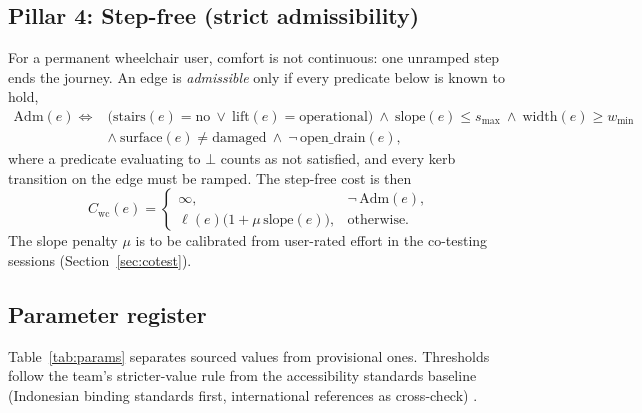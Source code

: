 \documentclass[11pt,a4paper]{article}
\begin{document}
\subsection{Pillar 4: Step-free (strict admissibility)}

For a permanent wheelchair user, comfort is not continuous: one unramped step ends the journey. An
edge is \emph{admissible} only if every predicate below is known to hold,
\begin{equation}
  \begin{aligned}
  \mathrm{Adm}(e)\iff{}&\big(\mathrm{stairs}(e)=\text{no}\ \lor\ \mathrm{lift}(e)=\text{operational}\big)
    \ \land\ \mathrm{slope}(e)\le s_{\max}\ \land\ \mathrm{width}(e)\ge w_{\min}\\
    &\land\ \mathrm{surface}(e)\ne\text{damaged}\ \land\ \lnot\,\mathrm{open\_drain}(e),
  \end{aligned}
  \label{eq:admissible}
\end{equation}
where a predicate evaluating to $\bot$ counts as not satisfied, and every kerb transition on the edge
must be ramped. The step-free cost is then
\begin{equation}
  C_{\mathrm{wc}}(e)=\begin{cases}
    \infty, & \lnot\,\mathrm{Adm}(e),\\[0.2em]
    \ell(e)\big(1+\mu\,\mathrm{slope}(e)\big), & \text{otherwise.}
  \end{cases}
  \label{eq:wheelchair}
\end{equation}
The slope penalty $\mu$ is to be calibrated from user-rated effort in the co-testing sessions
(Section~\ref{sec:cotest}).

\subsection{Parameter register}

Table~\ref{tab:params} separates sourced values from provisional ones. Thresholds follow the team's
stricter-value rule from the accessibility standards baseline (Indonesian binding standards first,
international references as cross-check) \cite{permenpupr14_2017,binamarga2023,ada2010standards}.
\end{document}
